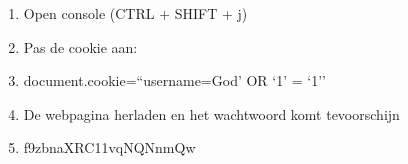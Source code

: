 \begin{enumerate}
\item Open console (CTRL + SHIFT + j)
\item Pas de cookie aan:
\item document.cookie=``username=God' OR `1' = `1''
\item De webpagina herladen en het wachtwoord komt tevoorschijn
\item f9zbnaXRC11vqNQNnmQw
\end{enumerate}